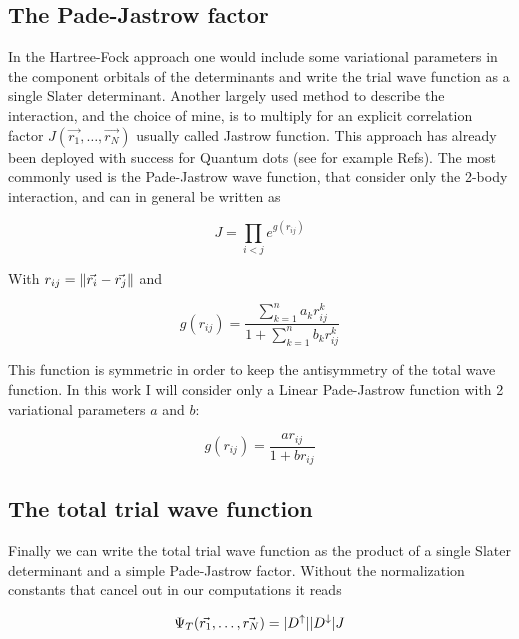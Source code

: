 \subsection{The Pade-Jastrow factor}

In the Hartree-Fock approach one would include some variational parameters in the component orbitals of the determinants and write the trial wave function as a single Slater determinant.
Another largely used method to describe the interaction, and the choice of mine, is to multiply for an explicit correlation factor $J(\vec{r_1},\dots,\vec{r_N})$ usually called Jastrow function.
This approach has already been deployed with success for Quantum dots (see for example Refs\cite{Harju1999,Harju2005,Pederiva2000,Colletti2002}).
The most commonly used is the Pade-Jastrow wave function\cite{MCMAbInitioQuantumChemistry}, that consider only the 2-body interaction, and can in general be written as

\begin{equation}
  J = \prod_{i<j}e^{g(r_{ij})}
\end{equation}

With $r_{ij}={\| \vec{r_i}-\vec{r_j} \|}$ and

\begin{equation}
  g(r_{ij})= \dfrac{\displaystyle\sum_{k=1}^n a_kr_{ij}^k}{1 +\displaystyle\sum_{k=1}^n b_kr_{ij}^k}
\end{equation}

This function is symmetric in order to keep the antisymmetry of the total wave function.
In this work I will consider only a Linear Pade-Jastrow function with 2 variational parameters $a$ and $b$:

\begin{equation}
  g(r_{ij})= \dfrac{ar_{ij}}{1+br_{ij}}
\end{equation}

\subsection{The total trial wave function}

Finally we can write the total trial wave function as the product of a single Slater determinant and a simple Pade-Jastrow factor.
Without the normalization constants that cancel out in our computations it reads

\begin{equation}
  \Psi_T(\vec{r_1},\dots,\vec{r_N})=|D^\uparrow||D^\downarrow|J
  \label{trial}
\end{equation}

